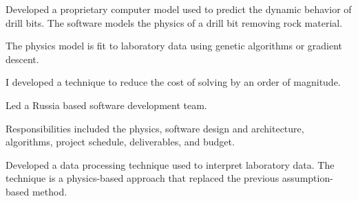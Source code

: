 \documentclass{leresume}
\begin{document}
		\begin{bulletedlist}
			
		\item 
					Developed a proprietary computer model used to predict the dynamic behavior of drill bits.  The software models the physics of a drill bit removing rock material.
					
		\begin{bulletedlist}
			
		\item 
							The physics model is fit to laboratory data using genetic algorithms or gradient descent.  
						
		\item 
							I developed a technique to reduce the cost of solving by an order of magnitude.
						
		\item Led a Russia based software development team.
		\item 
							Responsibilities included the physics, software design and architecture, algorithms, project schedule, deliverables, and budget.
						
		\end{bulletedlist}
	
		\item Developed a data processing technique used to interpret laboratory data.  The technique is a physics-based approach that replaced the previous assumption-based method.
		\end{bulletedlist}
	

    
    
    
    
    
    
    
    
	
	
    
    
\end{document}
